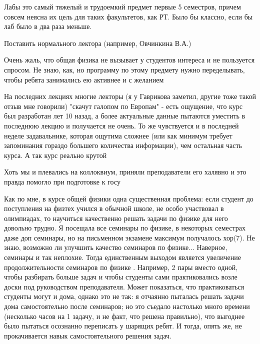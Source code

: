             \begin{commentbox}
                Лабы это самый тяжелый и трудоемкий предмет первые 5 семестров, причем совсем неясна их цель для таких факультетов, как РТ. Было бы классно, если бы лаб было в два раза меньше.
            \end{commentbox}

            \begin{commentbox}
                Поставить нормального лектора (например, Овчинкина В.А.)
            \end{commentbox}

            \begin{commentbox}
                Очень жаль, что общая физика не вызывает у студентов интереса и не пользуется спросом. Не знаю, как, но программу по этому предмету нужно переделывать, чтобы ребята занимались ею активнее и с желанием
            \end{commentbox}

            \begin{commentbox}
                На последних лекциях многие лекторы (я у Гаврикова заметил, другие тоже такой отзыв мне говорили) "скачут галопом по Европам" - есть ощущение, что курс был разработан лет 10 назад, а более актуальные данные пытаются уместить в последнюю лекцию и получается не очень. То же чувствуется и в последней неделе задавальнике, которая ощутима сложнее (или как минимум требует запоминания гораздо большего количества информации), чем остальная часть курса. А так курс реально крутой
            \end{commentbox}

            \begin{commentbox}
                Хоть мы и плевались на коллоквиум, приняли преподаватели его халявно и это правда помогло при подготовке к госу
            \end{commentbox}

            \begin{commentbox}
                Как по мне, в курсе общей физики одна существенная проблема: если студент до поступления на физтех учился в обычной школе, не особо участвовал в олимпиадах, то научиться качественно решать задачи по физике для него довольно трудно. Я посещала все семинары по физике, в некоторых семестрах даже доп семинары, но на письменном экзамене максимум получалось хор(7). Не знаю, возможно ли улучшить качество семинаров по физике... Наверное, семинары и так неплохие. Тогда единственным выходом является увеличение продолжительности семинаров по физике . Например, 2 пары вместо одной, чтобы разбирать больше задач и чтобы студенты сами практиковались возле доски под руководством преподавателя. Может показаться, что практиковаться студенты могут и дома, однако это не так: я отчаянно пыталась решать задачи дома самостоятельно после семинаров; но это съедало настолько много времени (несколько часов на 1 задачу, и не факт, что решена правильно), что выгоднее было пытаться осознанно переписать у шарящих ребят. И тогда, опять же, не прокачивается навык самостоятельного решения задач.
            \end{commentbox}

